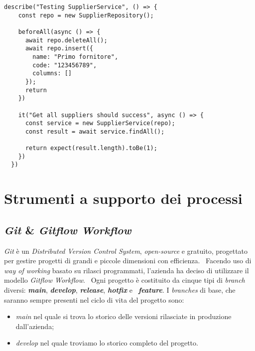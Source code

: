 \newpage
\begin{lstlisting}[caption=Esempio di \emph{test}, label={code:test}, captionpos=b]
  describe("Testing SupplierService", () => {
    const repo = new SupplierRepository();

    beforeAll(async () => {
      await repo.deleteAll();
      await repo.insert({
        name: "Primo fornitore",
        code: "123456789",
        columns: []
      });
      return 
    })

    it("Get all suppliers should success", async () => {
      const service = new SupplierService(repo);
      const result = await service.findAll();

      return expect(result.length).toBe(1);
    })
  })
\end{lstlisting}


\section{Strumenti a supporto dei processi}

\subsection{\emph{Git} \& \emph{Gitflow Workflow}}
\emph{Git} è un \emph{Distributed Version Control System}, \emph{open-source} e gratuito, progettato per gestire progetti di grandi e piccole dimensioni con efficienza. \
Facendo uso di \emph{way of working} basato su rilasci programmati, l'azienda ha deciso di utilizzare il modello \emph{Gitflow Workflow}. \
Ogni progetto è costituito da cinque tipi di \emph{branch} diversi: \textbf{\emph{main}}, \textbf{\emph{develop}}, \textbf{\emph{release}}, \textbf{\emph{hotfix}} e \
\textbf{\emph{feature}}. I \emph{branches} di base, che saranno sempre presenti nel ciclo di vita del progetto sono:
\begin{itemize}
  \item \emph{main} nel quale si trova lo storico delle versioni rilasciate in produzione dall'azienda;
  \item \emph{develop} nel quale troviamo lo storico completo del progetto. 
\end{itemize}  

